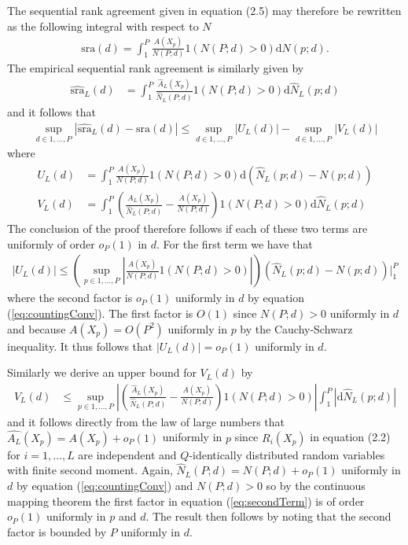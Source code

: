\documentclass[oupdraft]{bio}
\begin{document}
The sequential rank agreement given in equation
(2.5) may therefore be rewritten as the following integral
with respect to $N$
\begin{align}
  \textrm{sra}(d) = \int_{1}^P \frac{A(X_p)}{N(P; d)} 1(N(P;d)>0)\mathrm dN(p; d).
\end{align}
The empirical sequential rank agreement is similarly given by
\begin{align}
  \widehat{\textrm{sra}}_L(d) &= \int_1^P \frac{\widehat{A}_L(X_p)}{\widehat{N}_L(P; d)} 1(N(P;d)>0) \mathrm d \widehat{N}_L(p; d) 
\end{align}
and it follows that
\begin{align}
  \sup_{d \in 1,\ldots,P}\left|\widehat{\textrm{sra}}_L(d) - \textrm{sra}(d)\right| \leq \sup_{d \in 1,\ldots,P}\left|U_L(d)\right| - \sup_{d \in 1,\ldots,P}\left|V_L(d)\right|
\end{align}
where
\begin{align}
  U_L(d) &= \int_1^P\frac{A(X_p)}{N(P;d)} 1(N(P;d)>0) \mathrm d\left(\widehat{N}_L(p; d) - N(p; d)\right)\\
  V_L(d) &=  \int_1^P \left(\frac{\widehat{A}_L(X_p)}{\widehat{N}_L(P; d)} - \frac{A(X_p)}{N(P;d)}\right) 1(N(P;d)>0) \mathrm d\widehat{N}_L(p; d)
\end{align}
The conclusion of the proof therefore follows if each of these two
terms are uniformly of order $o_P(1)$ in $d$.  For the first term we
have that
\begin{align}
  \left|U_L(d)\right| \leq \left(\sup_{p \in 1,\ldots,P}\left|\frac{A(X_p)}{N(P;d)} 1(N(P;d)>0) \right|\right)\left(\widehat{N}_L(p; d) - N(p; d)\right)\biggr\rvert_1^P
\end{align}
where the second factor is $o_P(1)$ uniformly in $d$ by equation
(\ref{eq:countingConv}). The first factor is $O(1)$ since $N(P;d)>0$
uniformly in $d$ and because $A(X_p) = O(P^2)$ uniformly in $p$ by the Cauchy-Schwarz inequality. It
thus follows that $\left|U_L(d)\right| = o_P(1)$ uniformly in $d$.

Similarly we derive an upper bound for $V_L(d)$ by
\begin{align}
 V_L(d) &\leq \sup_{p \in 1,\ldots,P}\left|\left(\frac{\widehat{A}_L(X_p)}{\widehat{N}_L(P; d)} - \frac{A(X_p)}{N(P;d)}\right) 1(N(P;d)>0) \right| \int_1^P \left|\mathrm d\widehat{N}_L(p; d)\right|\label{eq:secondTerm}
\end{align}
and it follows directly from the law of large numbers that
$\widehat{A_L}(X_p) = A(X_p) + o_P(1)$ uniformly in $p$ since
$R_i(X_p)$ in equation (2.2) for $i=1,\ldots,L$ are
independent and $Q$-identically distributed random variables with
finite second moment. Again, $\widehat{N}_L(P; d) = N(P;d) + o_P(1)$ uniformly in $d$ by equation
(\ref{eq:countingConv}) and $N(P;d)>0$ so by the continuous mapping theorem the first factor
in equation (\ref{eq:secondTerm}) is of order $o_P(1)$ uniformly in
$p$ and $d$. The result then follows by noting that the second factor
is bounded by $P$ uniformly in $d$. 
\end{document}
